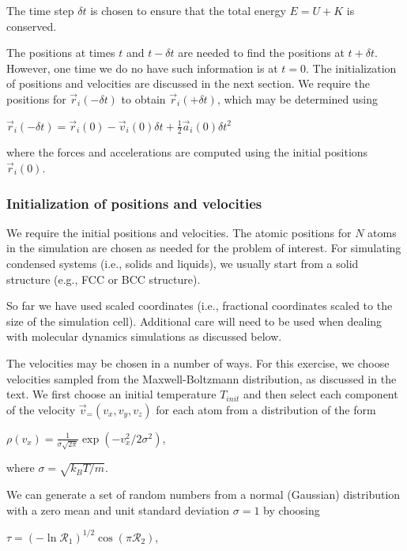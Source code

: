 \documentclass[11pt]{article}
\begin{document}
The time step \(\delta t\) is chosen to ensure that the total energy
\(E = U + K\) is conserved.

The positions at times \(t\) and \(t-\delta t\) are needed to find the
positions at \(t+\delta t\). However, one time we do no have such
information is at \(t=0\). The initialization of positions and
velocities are discussed in the next section. We require the positions
for \(\vec{r}_i(-\delta t)\) to obtain \(\vec{r}_i(+\delta t)\), which
may be determined using

\(\vec{r}_i(-\delta t) = \vec{r}_i(0) - \vec{v}_i(0)\delta t + \frac{1}{2} \vec{a}_i(0)\delta t^2\)

where the forces and accelerations are computed using the initial
positions \(\vec{r}_i(0)\).

\hypertarget{initialization-of-positions-and-velocities}{%
\subsubsection{Initialization of positions and
velocities}\label{initialization-of-positions-and-velocities}}

We require the initial positions and velocities. The atomic positions
for \(N\) atoms in the simulation are chosen as needed for the problem
of interest. For simulating condensed systems (i.e., solids and
liquids), we usually start from a solid structure (e.g., FCC or BCC
structure).

So far we have used scaled coordinates (i.e., fractional coordinates
scaled to the size of the simulation cell). Additional care will need to
be used when dealing with molecular dynamics simulations as discussed
below.

The velocities may be chosen in a number of ways. For this exercise, we
choose velocities sampled from the Maxwell-Boltzmann distribution, as
discussed in the text. We first choose an initial temperature
\(T_{init}\) and then select each component of the velocity
\(\vec{v}_= (v_x,v_y,v_z)\) for each atom from a distribution of the
form

\(\rho(v_x) = \frac{1}{\sigma \sqrt{2\pi}}\exp(-v_x^2/2\sigma^2)\),

where \(\sigma = \sqrt{k_B T/m}\).

We can generate a set of random numbers from a normal (Gaussian)
distribution with a zero mean and unit standard deviation \(\sigma = 1\)
by choosing

\(\tau = (-\ln \mathscr{R}_1)^{1/2} \cos(\pi\mathscr{R}_2)\),
\end{document}
